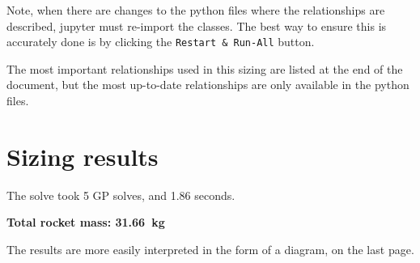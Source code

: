 \documentclass[12pt]{article}
\begin{document}
Note, when there are changes to the python files where the relationships are described, jupyter must re-import the classes. The best way to ensure this is accurately done is by clicking the \texttt{Restart \& Run-All} button. 

The most important relationships used in this sizing are listed at the end of the document, but the most up-to-date relationships are only available in the python files. 


\section{Sizing results}

The solve  took 5 GP solves, and 1.86 seconds. 

\textbf{Total rocket mass: 31.66~kg}

The results are more easily interpreted in the form of a diagram, on the last page.
\end{document}
